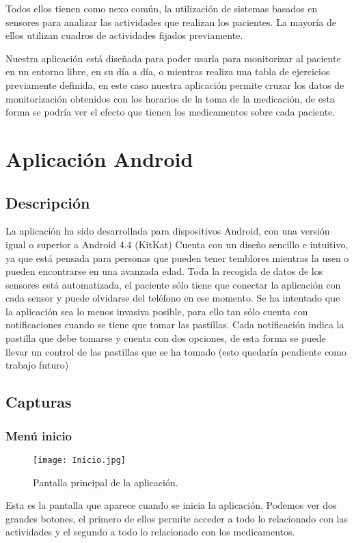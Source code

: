 \documentclass[11pt,spanish]{article}
\begin{document}
Todos ellos tienen como nexo común, la utilización de sistemas basados en sensores para analizar las actividades que realizan los pacientes. La mayoría de ellos utilizan cuadros de actividades fijados previamente. 
\newline

Nuestra aplicación está diseñada para poder usarla para monitorizar al paciente en un entorno libre, en su día a día, o mientras realiza una tabla de ejercicios previamente definida, en este caso nuestra aplicación permite cruzar los datos de monitorización obtenidos con los horarios de la toma de la medicación, de esta forma se podría ver el efecto que tienen los medicamentos sobre cada paciente.
\newpage

\section{Aplicación Android}
\subsection{Descripción}
La aplicación ha sido desarrollada para dispositivos Android, con una versión igual o superior a Android 4.4 (KitKat) Cuenta con un diseño sencillo e intuitivo, ya que está pensada para personas que pueden tener temblores mientras la usen o pueden encontrarse en una avanzada edad. Toda la recogida de datos de los sensores está automatizada, el paciente sólo tiene que conectar la aplicación con cada sensor y puede olvidarse del teléfono en ese momento. Se ha intentado que la aplicación sea lo menos invasiva posible, para ello tan sólo cuenta con notificaciones cuando se tiene que tomar las pastillas. Cada notificación indica la pastilla que debe tomarse y cuenta con dos opciones, de esta forma se puede llevar un control de las pastillas que se ha tomado (esto quedaría pendiente como trabajo futuro)
\newline

\subsection{Capturas}
\subsubsection{Menú inicio}
\begin{figure}[!htb]
\centering
\texttt{[image: Inicio.jpg]}
\caption{Pantalla principal de la aplicación.}
\end{figure}
Esta es la pantalla que aparece cuando se inicia la aplicación. Podemos ver dos grandes botones, el primero de ellos permite acceder a todo lo relacionado con las actividades y el segundo a todo lo relacionado con los medicamentos.
\newline
\end{document}
